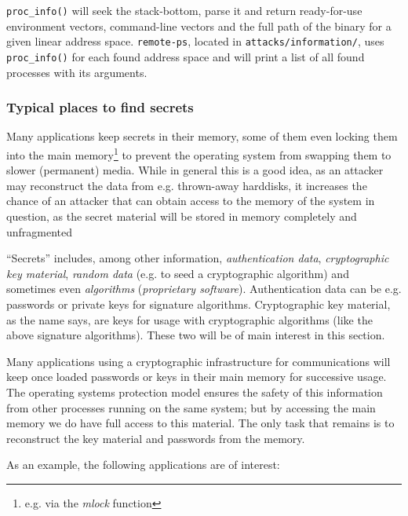 \texttt{proc\_info()} will seek the stack-bottom, parse it and return
ready-for-use environment vectors, command-line vectors and the full path of the
binary for a given linear address space. \texttt{remote-ps}, located in
\texttt{attacks/information/}, uses \texttt{proc\_info()} for each found address
space and will print a list of all found processes with its arguments.


\subsubsection{Typical places to find secrets}

Many applications keep secrets in their memory, some of them even locking them
into the main memory\footnote{e.g. via the \emph{mlock} function} to prevent the
operating system from swapping them to slower (permanent) media. While in
general this is a good idea, as an attacker may reconstruct the data from e.g.
thrown-away harddisks, it increases the chance of an attacker that can obtain
access to the memory of the system in question, as the secret material will be
stored in memory completely and unfragmented

``Secrets'' includes, among other information, \emph{authentication data},
\emph{cryptographic key material}, \emph{random data} (e.g. to seed a
cryptographic algorithm) and sometimes even \emph{algorithms} (\emph{proprietary
software}). Authentication data can be e.g.  passwords or private keys for
signature algorithms. Cryptographic key material, as the name says, are keys for
usage with cryptographic algorithms (like the above signature algorithms). These
two will be of main interest in this section.

Many applications using a cryptographic infrastructure for communications will
keep once loaded passwords or keys in their main memory for successive usage.
The operating systems protection model ensures the safety of this information
from other processes running on the same system; but by accessing the main
memory we do have full access to this material. The only task that remains is to
reconstruct the key material and passwords from the memory.

As an example, the following applications are of interest:

